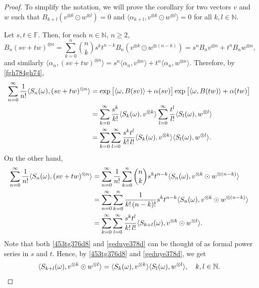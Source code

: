 \documentclass[12pt]{article}
\theoremstyle{remark}
\theoremstyle{remark}
\theoremstyle{remark}
\begin{document}
\begin{proof} To simplify the notation, we will prove the corollary for two vectors $v$ and $w$ such that $B_{k+l}(v^{\otimes k}\odot w^{\otimes l})=0$ and $\langle \alpha_{k+l},v^{\otimes k}\odot w^{\otimes l}\rangle=0$ for all $k,l\in \mathbb N$. 

Let $s,t\in \mathbb F$. Then, for each $n\in \mathbb N$, $n\geq2$,
\begin{equation*}B_n(sv+tw)^{\otimes n}=\sum_{k=0}^n{n\choose k}s^kt^{n-k}B_n(v^{\otimes k}\odot w^{\otimes (n-k)})=s^nB_nv^{\otimes n}+t^nB_nw^{\otimes n},\end{equation*}
and similarly $\langle \alpha_n,(sv+tw)^{\otimes n}\rangle=s^n\langle\alpha_n,v^{\otimes n}\rangle+t^n\langle\alpha_n,w^{\otimes n}\rangle$. 
Therefore, by \eqref{fgh784gh74},
\begin{align}\label{453tg376d8}
\sum_{n=0}^\infty \frac 1{n!}\langle S_n(\omega),(sv+tw)^{\otimes n}\rangle&=\exp\big[\langle\omega,B(sv)\rangle+\alpha(sv)\big]\exp\big[\langle\omega,B(tw)\rangle+\alpha(tw)\big]\notag\\
&=\sum_{k=0}^\infty \frac {s^k}{k!}\langle S_k(\omega),v^{\otimes k}\rangle\sum_{l=0}^\infty \frac {t^l}{l!}\langle S_l(\omega),w^{\otimes l}\rangle\notag\\
&=\sum_{k=0}^\infty\sum_{l=0}^\infty \frac{s^kt^l}{k!\,l!}\langle S_k(\omega),v^{\otimes k}\rangle\langle S_l(\omega),w^{\otimes l}\rangle.\end{align}
On the other hand,
\begin{align}\label{geduye378d}
\sum_{n=0}^\infty \frac 1{n!}\langle S_n(\omega),(sv+tw)^{\otimes n}\rangle&=\sum_{n=0}^\infty\frac1{n!}\sum_{k=0}^n{n \choose k}s^kt^{n-k}\langle S_n(\omega),v^{\otimes k}\odot w^{\otimes (n-k)}\rangle\notag\\
& =\sum_{n=0}^\infty\sum_{k=0}^n\frac1{k!\,(n-k)!}s^kt^{n-k}\langle S_n(\omega),v^{\otimes k}\odot w^{\otimes (n-k)}\rangle\notag\\
&=\sum_{k=0}^\infty\sum_{l=0}^\infty\frac{s^kt^l}{k!\,l!}\langle S_{k+l}(\omega),v^{\otimes k}\odot w^{\otimes l}\rangle.
\end{align}
Note that both \eqref{453tg376d8} and \eqref{geduye378d} can be thought of as formal power series in $s$ and $t$. Hence, by \eqref{453tg376d8} and \eqref{geduye378d}, we get 
\begin{equation*}
\langle S_{k+l}(\omega),v^{\otimes k}\odot w^{\otimes l}\rangle=\langle S_k(\omega),v^{\otimes k}\rangle \langle S_l(\omega), w^{\otimes l}\rangle,\quad k,l\in \mathbb N.\qedhere\end{equation*}
\end{proof}
\end{document}
